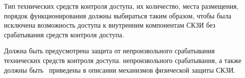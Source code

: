 \label{R.PS.SensorsQuality}
Тип технических средств контроля доступа, их количество, места 
размещения, порядок функционирования должны выбираться таким образом, 
чтобы была исключена возможность доступа к внутренним компонентам СКЗИ 
без срабатывания средств контроля доступа.

\label{R.PS.SensorsFaults}
Должна быть предусмотрена защита от непроизвольного срабатывания технических 
средств контроля доступа.  непроизвольного 
срабатывания, а также  должны 
быть~ приведены в описании механизмов физической защиты СКЗИ. 

